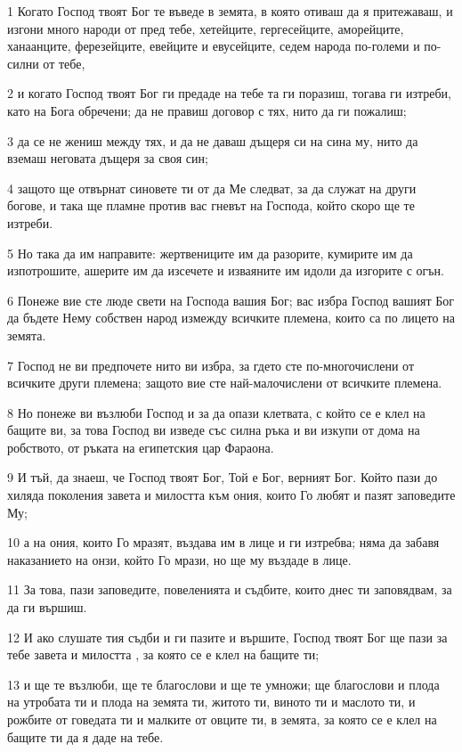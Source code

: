 \par 1 Когато Господ твоят Бог те въведе в земята, в която отиваш да я притежаваш, и изгони много народи от пред тебе, хетейците, гергесейците, аморейците, ханаанците, ферезейците, евейците и евусейците, седем народа по-големи и по-силни от тебе,
\par 2 и когато Господ твоят Бог ги предаде на тебе та ги поразиш, тогава ги изтреби, като на Бога обречени; да не правиш договор с тях, нито да ги пожалиш;
\par 3 да се не жениш между тях, и да не даваш дъщеря си на сина му, нито да вземаш неговата дъщеря за своя син;
\par 4 защото ще отвърнат синовете ти от да Ме следват, за да служат на други богове, и така ще пламне против вас гневът на Господа, който скоро ще те изтреби.
\par 5 Но така да им направите: жертвениците им да разорите, кумирите им да изпотрошите, ашерите им да изсечете и изваяните им идоли да изгорите с огън.
\par 6 Понеже вие сте люде свети на Господа вашия Бог; вас избра Господ вашият Бог да бъдете Нему собствен народ измежду всичките племена, които са по лицето на земята.
\par 7 Господ не ви предпочете нито ви избра, за гдето сте по-многочислени от всичките други племена; защото вие сте най-малочислени от всичките племена.
\par 8 Но понеже ви възлюби Господ и за да опази клетвата, с който се е клел на бащите ви, за това Господ ви изведе със силна ръка и ви изкупи от дома на робството, от ръката на египетския цар Фараона.
\par 9 И тъй, да знаеш, че Господ твоят Бог, Той е Бог, верният Бог. Който пази до хиляда поколения завета и милостта към ония, които Го любят и пазят заповедите Му;
\par 10 а на ония, които Го мразят, въздава им в лице и ги изтребва; няма да забавя наказанието на онзи, който Го мрази, но ще му въздаде в лице.
\par 11 За това, пази заповедите, повеленията и съдбите, които днес ти заповядвам, за да ги вършиш.
\par 12 И ако слушате тия съдби и ги пазите и вършите, Господ твоят Бог ще пази за тебе завета и милостта , за която се е клел на бащите ти;
\par 13 и ще те възлюби, ще те благослови и ще те умножи; ще благослови и плода на утробата ти и плода на земята ти, житото ти, виното ти и маслото ти, и рожбите от говедата ти и малките от овците ти, в земята, за която се е клел на бащите ти да я даде на тебе.
